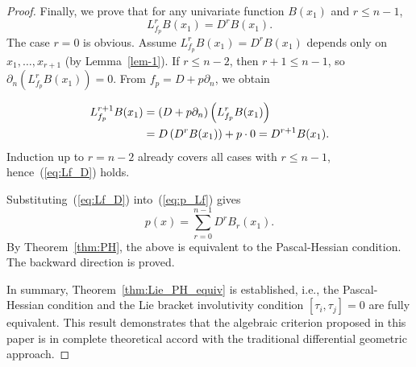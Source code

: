 \documentclass[10pt,a4paper]{amsart}
\begin{document}
\begin{proof}
	Finally, we prove that for any univariate function $B(x_1)$ and $r\leq n-1$,
	\begin{equation}\label{eq:Lf_D}
		L_{f_p}^rB(x_1)=D^rB(x_1).
	\end{equation}
	The case $r=0$ is obvious. Assume $L_{f_p}^rB(x_1)=D^rB(x_1)$ depends only on $x_1,\ldots,x_{r+1}$ (by Lemma~\ref{lem-1}). If $r\leq n-2$, then $r+1\leq n-1$, so $\partial_n\left(L_{f_p}^rB(x_1)\right)=0$. From $f_p=D+p\partial_n$, we obtain
	
	\begin{align}
		L_{f_p}^{r+1}B(x_1)&=(D+p\partial_n)\left(L_{f_p}^rB(x_1)\right)\notag\\
		&=D\left(D^rB(x_1)\right)+p\cdot0=D^{r+1}B(x_1).
	\end{align}
	Induction up to $r=n-2$ already covers all cases with $r\leq n-1$, hence~(\ref{eq:Lf_D}) holds.

	Substituting~(\ref{eq:Lf_D}) into~(\ref{eq:p_Lf}) gives
	\[
	p(x)=\sum_{r=0}^{n-1}D^rB_r(x_1).
	\]
	By Theorem~\ref{thm:PH}, the above is equivalent to the Pascal-Hessian condition. The backward direction is proved.

	In summary, Theorem~\ref{thm:Lie_PH_equiv} is established, i.e., the Pascal-Hessian condition and the Lie bracket involutivity condition $[\tau_i,\tau_j]=0$ are fully equivalent. This result demonstrates that the algebraic criterion proposed in this paper is in complete theoretical accord with the traditional differential geometric approach.
\end{proof}
\end{document}
